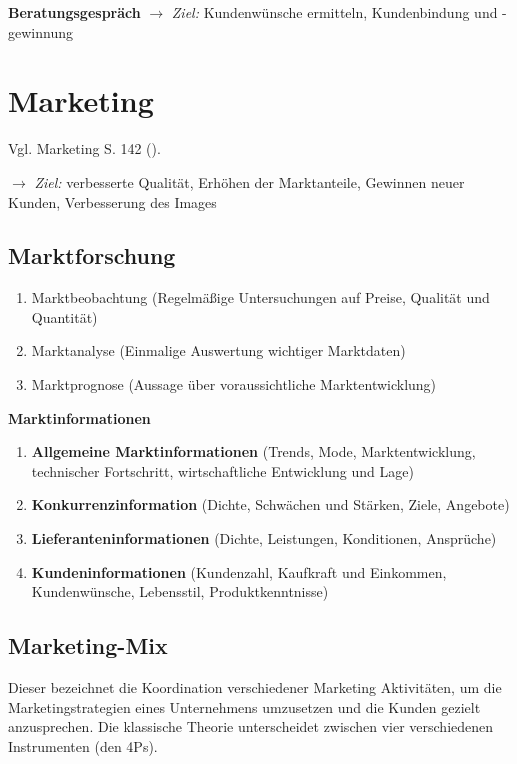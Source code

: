 \textbf{Beratungsgespräch} $\to$ \emph{Ziel:} Kundenwünsche ermitteln,
Kundenbindung und -gewinnung

\newpage

\section{Marketing}\label{marketing}

Vgl. Marketing S. 142 (\textcite{heiser:2017:betriebsfuhrung}).

$\to$ \emph{Ziel:} verbesserte Qualität, Erhöhen der Marktanteile,
Gewinnen neuer Kunden, Verbesserung des Images

\subsection{Marktforschung}\label{marktforschung}

\begin{enumerate}
\item
  Marktbeobachtung (Regelmäßige Untersuchungen auf Preise, Qualität und
  Quantität)
\item
  Marktanalyse (Einmalige Auswertung wichtiger Marktdaten)
\item
  Marktprognose (Aussage über voraussichtliche Marktentwicklung)
\end{enumerate}

\textbf{Marktinformationen}

\begin{enumerate}
\item
  \textbf{Allgemeine Marktinformationen} (Trends, Mode,
  Marktentwicklung, technischer Fortschritt, wirtschaftliche Entwicklung
  und Lage)
\item
  \textbf{Konkurrenzinformation} (Dichte, Schwächen und Stärken, Ziele,
  Angebote)
\item
  \textbf{Lieferanteninformationen} (Dichte, Leistungen, Konditionen,
  Ansprüche)
\item
  \textbf{Kundeninformationen} (Kundenzahl, Kaufkraft und Einkommen,
  Kundenwünsche, Lebensstil, Produktkenntnisse)
\end{enumerate}

\subsection{Marketing-Mix}\label{marketing-mix}

Dieser bezeichnet die Koordination verschiedener Marketing Aktivitäten,
um die Marketingstrategien eines Unternehmens umzusetzen und die Kunden
gezielt anzusprechen. Die klassische Theorie unterscheidet zwischen vier
verschiedenen Instrumenten (den 4Ps).

